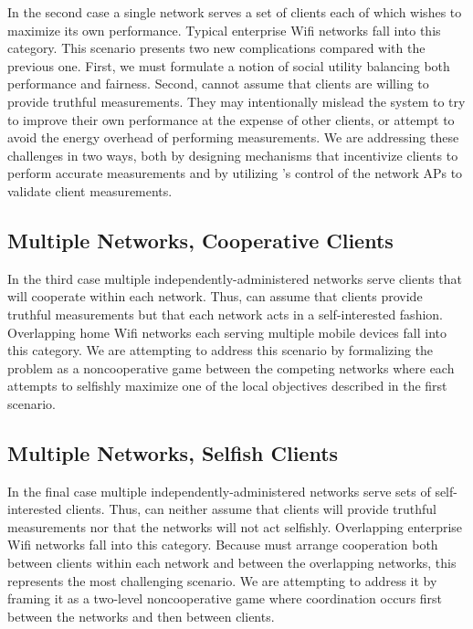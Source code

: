 In the second case a single network serves a set of clients each of which
wishes to maximize its own performance. Typical enterprise Wifi networks fall
into this category. This scenario presents two new complications compared
with the previous one. First, we must formulate a notion of social utility
balancing both performance and fairness. Second, \PS{} cannot assume that
clients are willing to provide truthful measurements. They may intentionally
mislead the system to try to improve their own performance at the expense of
other clients, or attempt to avoid the energy overhead of performing
measurements. We are addressing these challenges in two ways, both by
designing mechanisms that incentivize clients to perform accurate
measurements and by utilizing \PS{}'s control of the network APs to validate
client measurements.

\subsection{Multiple Networks, Cooperative Clients}

In the third case multiple independently-administered networks serve
clients that will cooperate within each network. Thus, \PS{} can assume that
clients provide truthful measurements but that each network acts in a
self-interested fashion. Overlapping home Wifi networks each serving multiple
mobile devices fall into this category. We are attempting to address this
scenario by formalizing the problem as a noncooperative game between the
competing networks where each attempts to selfishly maximize one of the local
objectives described in the first scenario.

\subsection{Multiple Networks, Selfish Clients}

In the final case multiple independently-administered networks serve sets of
self-interested clients. Thus, \PS{} can neither assume that clients will
provide truthful measurements nor that the networks will not act selfishly.
Overlapping enterprise Wifi networks fall into this category. Because \PS{}
must arrange cooperation both between clients within each network and between
the overlapping networks, this represents the most challenging scenario. We
are attempting to address it by framing it as a two-level noncooperative game
where coordination occurs first between the networks and then between
clients.
